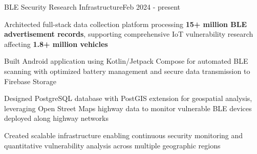 \begin{joblong}{BLE Security Research Infrastructure}{Feb 2024 - present}
	\item Architected full-stack data collection platform processing \textbf{15+ million BLE advertisement records}, supporting comprehensive IoT vulnerability research affecting \textbf{1.8+ million vehicles}
	\item Built Android application using Kotlin/Jetpack Compose for automated BLE scanning with optimized battery management and secure data transmission to Firebase Storage
	\item Designed PostgreSQL database with PostGIS extension for geospatial analysis, leveraging Open Street Maps highway data to monitor vulnerable BLE devices deployed along highway networks
	\item Created scalable infrastructure enabling continuous security monitoring and quantitative vulnerability analysis across multiple geographic regions
\end{joblong}
